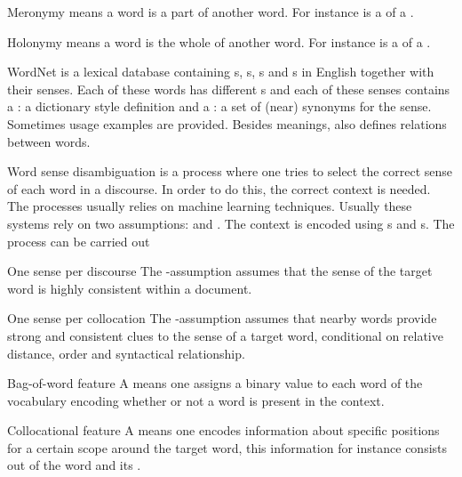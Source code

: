 \begin{df}{Meronymy}
\sb{} means a word is a part of another word. For instance  is a  of a .
\end{df}
\begin{df}{Holonymy}
\sb{} means a word is the whole of another word. For instance  is a  of a .
\end{df}
\begin{df}{WordNet}
\sb{} is a lexical database containing s, s, s and s in English together with their senses. Each of these words has different s and each of these senses contains a : a dictionary style definition and a : a set of (near) synonyms for the sense. Sometimes usage examples are provided. Besides meanings, \sb{} also defines relations between words.
\end{df}
\begin{df}{Word sense disambiguation}
\sb{} is a process where one tries to select the correct sense of each word in a discourse. In order to do this, the correct context is needed. The processes usually relies on machine learning techniques. Usually these systems rely on two assumptions:  and . The context is encoded using s and s. The process can be carried out 
\end{df}
\begin{tm}{One sense per discourse}
The \sb{}-assumption assumes that the sense of the target word is highly consistent within a document.
\end{tm}
\begin{tm}{One sense per collocation}
The \sb{}-assumption assumes that nearby words provide strong and consistent clues to the sense of a target word, conditional on relative distance, order and syntactical relationship.
\end{tm}
\begin{df}{Bag-of-word feature}
A \sb{} means one assigns a binary value to each word of the vocabulary encoding whether or not a word is present in the context.
\end{df}
\begin{df}{Collocational feature}
A \sb{} means one encodes information about specific positions for a certain scope around the target word, this information for instance consists out of the word and its .
\end{df}